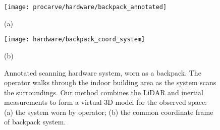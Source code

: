 \documentclass[12pt,onecolumn,oneside]{book}
\begin{document}




\begin{figure}[t]

	\begin{minipage}[c]{0.54\linewidth}
		\centerline{\texttt{[image: procarve/hardware/backpack\_annotated]}}
		\centerline{(a)}\medskip
	\end{minipage}
	\hfill
	\begin{minipage}[c]{0.46\linewidth}
		\centerline{\texttt{[image: hardware/backpack\_coord\_system]}}
		\centerline{(b)}\medskip
	\end{minipage}

	\caption[Annotated scanning hardware system.]{Annotated scanning hardware system, worn as a backpack.  The operator walks through the indoor building area as the system scans the surroundings.  Our method combines the LiDAR and inertial measurements to form a virtual 3D model for the observed space:  (a) the system worn by operator; (b) the common coordinate frame of backpack system.}
	\label{fig:backpack}

\end{figure}
\end{document}
